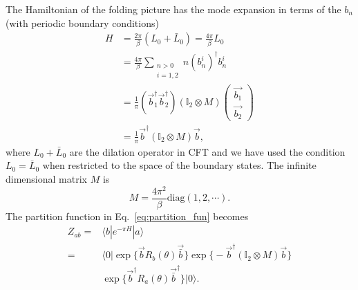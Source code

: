 The Hamiltonian of the folding picture has the mode expansion in terms of the $b_n$ (with periodic boundary conditions)
\begin{equation}
\begin{aligned}
  H &= \frac{2\pi}{\beta} (L_0 + \bar{L}_0) =  \frac{4\pi}{\beta}  L_0 \\
  &= \frac{4\pi}{\beta}\sum_{\substack{n > 0\\ i=1,2} }  n (b^i_n)^{\dagger} b^i_n \\
  &=  \frac{1}{\pi}(\vec{b}_1^{\dagger} \vec{b}_2^{\dagger} ) (\mathbb{I}_2  \otimes M)
\begin{pmatrix}
  \vec{{b}_1}\\
  \vec{{b}_2}
\end{pmatrix}\\
 &= \frac{1}{\pi} \vec{b}^{\dagger}  (\mathbb{I}_2  \otimes M)  \vec{b} ,
\end{aligned}
\end{equation}
where $L_0+ \bar{L}_0$ are the dilation operator in CFT and we have used the condition $L_0 = \bar{L}_0$ when restricted to the space of the boundary states. The infinite dimensional matrix $M$ is
\begin{equation}
M =  \frac{4\pi^2}{\beta} \text{diag}( 1, 2, \cdots ).
\end{equation}
The partition function in Eq.~\eqref{eq:partition_fun} becomes
\begin{equation}
\label{eq:Zab-bd}
\begin{aligned}
Z_{ab} =& \langle b | e^{-\pi H} | a \rangle \\
=& \langle 0 | \exp\Big\{  \vec{b} R_b( \theta )    \vec{\bar{b}} \Big\}  \exp\Big\{ -\vec{b}^{\dagger}  (\mathbb{I}_2  \otimes M)  \vec{b} \Big\} \\
&\exp\Big\{  \vec{b}^{\dagger} R_a( \theta )    \vec{\bar{b}}^{\dagger} \Big\} | 0\rangle .
\end{aligned}
\end{equation}

